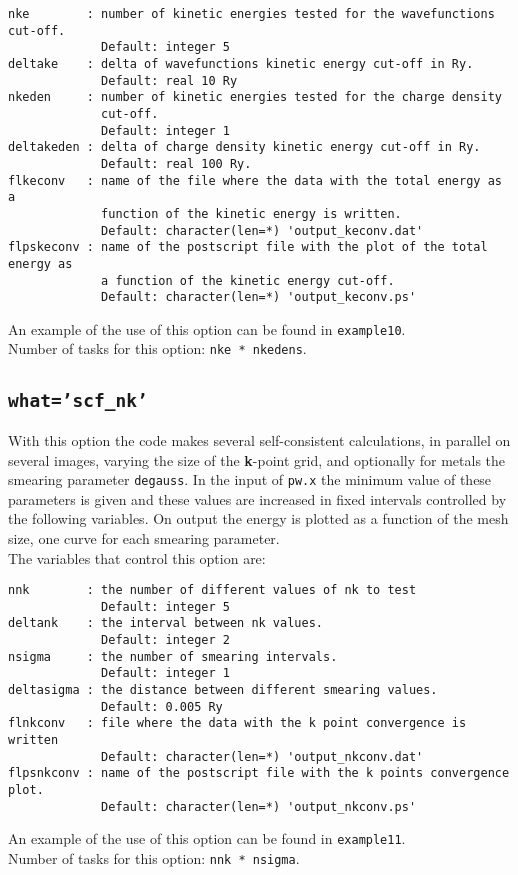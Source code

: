 \documentclass[12pt,a4paper]{article}
\begin{document}
\begin{verbatim}
nke        : number of kinetic energies tested for the wavefunctions cut-off.
             Default: integer 5
deltake    : delta of wavefunctions kinetic energy cut-off in Ry.
             Default: real 10 Ry
nkeden     : number of kinetic energies tested for the charge density
             cut-off.
             Default: integer 1
deltakeden : delta of charge density kinetic energy cut-off in Ry.
             Default: real 100 Ry.
flkeconv   : name of the file where the data with the total energy as a
             function of the kinetic energy is written.
             Default: character(len=*) 'output_keconv.dat'
flpskeconv : name of the postscript file with the plot of the total energy as
             a function of the kinetic energy cut-off.
             Default: character(len=*) 'output_keconv.ps'
\end{verbatim}
An example of the use of this option can be found in \texttt{example10}. \\
Number of tasks for this option: \texttt{nke * nkedens}.

\subsection{\texttt{what='scf\_nk'}}
With this option the code makes several self-consistent calculations, 
in parallel on several images, varying the size of the {\bf k}-point grid, 
and optionally for metals the smearing parameter \texttt{degauss}. In the 
input of \texttt{pw.x} the minimum value of these parameters is given and 
these values are increased in fixed intervals controlled by the following 
variables. On output the energy is plotted as a function of the mesh size, 
one curve for each smearing parameter.\\
The variables that control this option are:

\begin{verbatim}
nnk        : the number of different values of nk to test
             Default: integer 5
deltank    : the interval between nk values.
             Default: integer 2
nsigma     : the number of smearing intervals.
             Default: integer 1 
deltasigma : the distance between different smearing values.
             Default: 0.005 Ry
flnkconv   : file where the data with the k point convergence is written
             Default: character(len=*) 'output_nkconv.dat'
flpsnkconv : name of the postscript file with the k points convergence plot.
             Default: character(len=*) 'output_nkconv.ps'
\end{verbatim}
An example of the use of this option can be found in \texttt{example11}. \\
Number of tasks for this option: \texttt{nnk * nsigma}.
\end{document}
